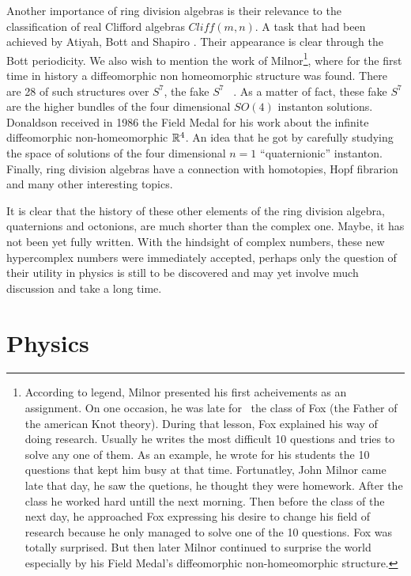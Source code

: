\documentclass[a4paper,12pt]{book}
\begin{document}
Another importance of ring division algebras is their relevance to the
classification of real Clifford algebras $Cliff\left( m,n\right) .$ A task
that had been achieved by Atiyah, Bott and Shapiro \cite{abs}. Their
appearance is clear through the Bott periodicity. We also wish to mention
the work of Milnor\footnote{%
According to legend, Milnor presented his first acheivements as an
assignment. On one occasion, he was late for \ the class of Fox (the Father
of the american Knot theory). During that lesson, Fox explained his way of
doing research. Usually he writes the most difficult 10 questions and tries
to solve any one of them. As an example, he wrote for his students the 10
questions that kept him busy at that time. Fortunatley, John Milnor came
late that day, he saw the quetions, he thought they were homework. After the
class he worked hard untill the next morning. Then before the class of the
next day, he approached Fox expressing his desire to change his field of
research because he only managed to solve one of the 10 questions. Fox was
totally surprised. But then later Milnor continued to surprise the world
especially by his Field Medal's diffeomorphic non-homeomorphic structure.},
where for the first time in history a diffeomorphic non homeomorphic
structure was found. There are 28 of such structures over $S^{7}$, the fake $%
S^{7}$ \ \cite{milnor}. As a matter of fact, these fake $S^{7}$ are the
higher bundles of the four dimensional $SO\left( 4\right) $ instanton
solutions\cite{yoniama}. Donaldson received in 1986 the Field Medal for his
work about the infinite diffeomorphic non-homeomorphic $\Bbb{R}^{4}$. An
idea that he got by carefully studying the space of solutions of the four
dimensional $n=1$ ``quaternionic'' instanton. Finally, ring division
algebras have a connection with homotopies, Hopf fibrarion and many other
interesting topics.

It is clear that the history of these other elements of the ring division
algebra, quaternions and octonions, are much shorter than the complex one.
Maybe, it has not been yet fully written. With the hindsight of complex
numbers, these new hypercomplex numbers were immediately accepted, perhaps
only the question of their utility in physics is still to be discovered and
may yet involve much discussion and take a long time.

\section{Physics}
\end{document}
